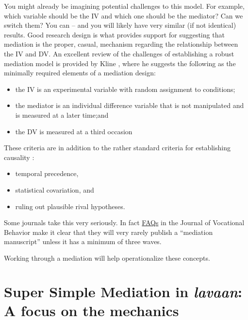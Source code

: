 \documentclass[
  11pt,
]{book}
\providecommand{\tightlist}{%
  \setlength{\itemsep}{0pt}\setlength{\parskip}{0pt}}
\begin{document}
You might already be imagining potential challenges to this model. For example, which variable should be the IV and which one should be the mediator? Can we switch them? You can -- and you will likely have very similar (if not identical) results. Good research design is what provides support for suggesting that mediation is the proper, casual, mechanism regarding the relationship between the IV and DV. An excellent review of the challenges of establishing a robust mediation model is provided by Kline \citeyearpar{kline_mediation_2015}, where he suggests the following as the minimally required elements of a mediation design:

\begin{itemize}
\tightlist
\item
  the IV is an experimental variable with random assignment to conditions;
\item
  the mediator is an individual difference variable that is not manipulated and is measured at a later time;and
\item
  the DV is measured at a third occasion
\end{itemize}

These criteria are in addition to the rather standard criteria for establishing causality \citep[see][ for a review]{stone-romero_research_2010}:

\begin{itemize}
\tightlist
\item
  temporal precedence,
\item
  statistical covariation, and
\item
  ruling out plausible rival hypotheses.
\end{itemize}

Some journals take this very seriously. In fact \href{https://www.journals.elsevier.com/journal-of-vocational-behavior/news/frequently-asked-questions-about-submitting-a-manuscript}{FAQs} in the Journal of Vocational Behavior make it clear that they will very rarely publish a ``mediation manuscript'' unless it has a minimum of three waves.

Working through a mediation will help operationalize these concepts.

\hypertarget{super-simple-mediation-in-lavaan-a-focus-on-the-mechanics}{%
\section{\texorpdfstring{Super Simple Mediation in \emph{lavaan}: A focus on the mechanics}{Super Simple Mediation in lavaan: A focus on the mechanics}}\label{super-simple-mediation-in-lavaan-a-focus-on-the-mechanics}}
\end{document}
